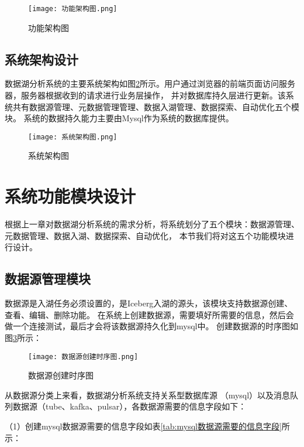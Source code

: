 \begin{figure}[H]
  \centering
  \texttt{[image: 功能架构图.png]}
  \caption{功能架构图}
  \label{fig:功能架构图}
\end{figure}

\subsection{系统架构设计}

数据湖分析系统的主要系统架构如图\ref{fig:系统架构图}所示。用户通过浏览器的前端页面访问服务器，服务器根据收到的请求进行业务层操作，
并对数据库持久层进行更新。该系统共有数据源管理、元数据管理管理、数据入湖管理、数据探索、自动优化五个模块。
系统的数据持久能力主要由Mysql作为系统的数据库提供。

\begin{figure}[H]
  \centering
  \texttt{[image: 系统架构图.png]}
  \caption{系统架构图}
  \label{fig:系统架构图}
\end{figure}

\section{系统功能模块设计}

根据上一章对数据湖分析系统的需求分析，将系统划分了五个模块：数据源管理、元数据管理、数据入湖、数据探索、自动优化，
本节我们将对这五个功能模块进行设计。

\subsection{数据源管理模块}

数据源是入湖任务必须设置的，是Iceberg入湖的源头，该模块支持数据源创建、查看、编辑、删除功能。
在系统上创建数据源，需要填好所需要的信息，然后会做一个连接测试，最后才会将该数据源持久化到mysql中。
创建数据源的时序图如图\ref{fig:数据源创建时序图}所示：

\begin{figure}[H]
  \centering
  \texttt{[image: 数据源创建时序图.png]}
  \caption{数据源创建时序图}
  \label{fig:数据源创建时序图}
\end{figure}

从数据源分类上来看，数据湖分析系统支持关系型数据库源
（mysql）以及消息队列数据源（tube、kafka、pulsar），各数据源需要的信息字段如下：

（1）创建mysql数据源需要的信息字段如表\ref{tab:mysql数据源需要的信息字段}所示：

